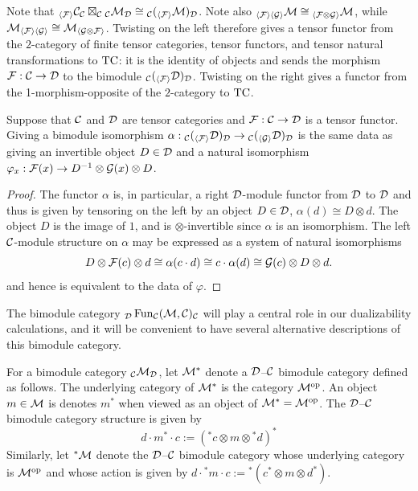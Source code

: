 \documentclass{amsart}
\begin{document}
Note that ${}_{\langle \mathcal F \rangle} \mathcal C_\mathcal C \boxtimes_{\mathcal C} {}_{\mathcal C} \mathcal M_\mathcal D \cong {}_{\mathcal C} ({}_{\langle \mathcal F \rangle} \mathcal M)_\mathcal D$.  Note also ${}_{\langle \mathcal F \rangle \langle \mathcal G \rangle} \mathcal M \cong {}_{\langle \mathcal F \otimes \mathcal G \rangle} \mathcal M$, while $\mathcal M_{\langle \mathcal F \rangle \langle \mathcal G \rangle} \cong  \mathcal M_{\langle \mathcal G \otimes \mathcal F \rangle}$.  Twisting on the left therefore gives a tensor functor from the $2$-category of finite tensor categories, tensor functors, and tensor natural transformations to $\mathrm{TC}$: it is the identity of objects and sends the morphism $\mathcal F: \mathcal C \rightarrow \mathcal D$ to the bimodule ${}_{\mathcal C} ({}_{\langle \mathcal F \rangle} \mathcal D)_{\mathcal D}$.  Twisting on the right gives a functor from the 1-morphism-opposite of the $2$-category to $\mathrm{TC}$.

\begin{lemma} \label{lem:BimoduleToFunctor}
Suppose that $\mathcal C$ and $\mathcal D$ are tensor categories and $\mathcal F: \mathcal C \rightarrow \mathcal D$ is a tensor functor.
Giving a bimodule isomorphism $\alpha:{}_{\mathcal C} ({}_{\langle \mathcal F \rangle} \mathcal D)_\mathcal D \rightarrow {}_{\mathcal C} ({}_{\langle \mathcal G \rangle} \mathcal D)_\mathcal D$ is the same data as giving an invertible object $D \in \mathcal D$ and a natural isomorphism $\varphi_x: \mathcal F(x) \rightarrow D^{-1} \otimes \mathcal G(x) \otimes D$.
\end{lemma}
\begin{proof}
The functor $\alpha$ is, in particular, a right $\mathcal D$-module functor from $\mathcal D$ to $\mathcal D$ and thus is given by tensoring on the left by an object $D \in \mathcal D$, $\alpha(d) \cong D \otimes d$. The object $D$ is the image of $1$, and is $\otimes$-invertible since $\alpha$ is an isomorphism. The left $\mathcal C$-module structure on $\alpha$ may be expressed as a system of natural isomorphisms
\begin{equation*}
	D \otimes \mathcal F(c) \otimes d \cong \alpha (c \cdot d) \cong c \cdot \alpha(d) \cong \mathcal G(c) \otimes D \otimes d.
\end{equation*}
and hence is equivalent to the data of $\varphi$. 
\end{proof}

The bimodule category ${}_\mathcal D \operatorname{Fun}_\mathcal C(\mathcal M,\mathcal C)_\mathcal C$ will play a central role in our dualizability calculations, and it will be convenient to have several alternative descriptions of this bimodule category.

\begin{definition} \label{def:Dual_bimodule_notation}
For a bimodule category ${}_\mathcal C \mathcal M_\mathcal D$, let $\mathcal M^*$ denote a $\mathcal D$--$\mathcal C$ bimodule category defined as follows.  The underlying category of $\mathcal M^*$ is the category $\mathcal M^{\mathrm{op}}$. An object $m \in \mathcal M$ is denotes $m^*$ when viewed as an object of $\mathcal M^* = \mathcal M^{\mathrm{op}}$.  The $\mathcal D$--$\mathcal C$ bimodule category structure is given by
\begin{equation*}
	d\cdot m^* \cdot c := ({}^*c \otimes m \otimes {}^*d)^*
\end{equation*}
Similarly, let ${}^*\mathcal M$ denote the $\mathcal D$--$\mathcal C$ bimodule category whose underlying category is $\mathcal M^{\mathrm{op}}$ and whose action is given by $d\cdot {}^*m \cdot c := {}^*(c^* \otimes m \otimes d^*)$.  
\end{definition}
\end{document}

